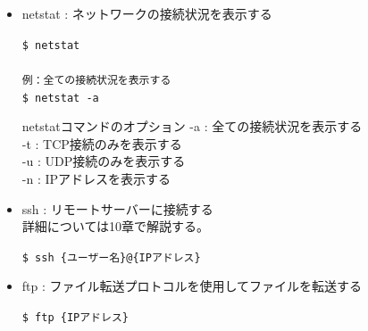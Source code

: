 \documentclass[a4paper, 11pt, dvipdfmx]{jsarticle}
\begin{document}
\begin{itemize}
\begin{johobox}{ルーティングとは}
    ルーティングとは、ネットワーク上のデータを送信する際に、どの経路を通って送信するかを決定することである。ルーティングテーブルは、どの経路を通って送信するかを示すものである。
  \end{johobox}
  \begin{terminalbox}
    \verb|$ route|
  \end{terminalbox}
  \item netstat : ネットワークの接続状況を表示する
  \begin{terminalbox}
    \verb|$ netstat|\\\\
    \verb|例：全ての接続状況を表示する|\\
    \verb|$ netstat -a|
  \end{terminalbox}
  \begin{hosokubox}{netstatコマンドのオプション}
    -a : 全ての接続状況を表示する\\
    -t : TCP接続のみを表示する\\
    -u : UDP接続のみを表示する\\
    -n : IPアドレスを表示する
  \end{hosokubox}
  \item ssh : リモートサーバーに接続する\\
  詳細については10章で解説する。
  \begin{terminalbox}
    \verb|$ ssh {ユーザー名}@{IPアドレス}|
  \end{terminalbox}
  \item ftp : ファイル転送プロトコルを使用してファイルを転送する
  \begin{terminalbox}
    \verb|$ ftp {IPアドレス}|
  \end{terminalbox}
\end{itemize}
\end{document}
